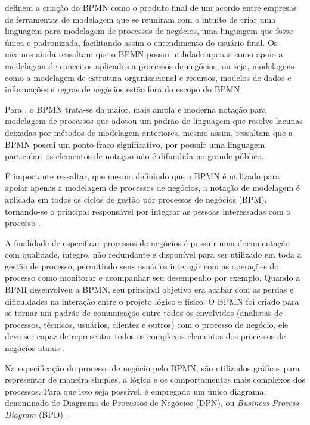 \documentclass[
	12pt,				%
	openright,			%
	oneside,			%
	a4paper,			%
	chapter=TITLE,		%
	section=TITLE,		%
	english,			%
	french,				%
	spanish,			%
	brazil				%
	]{abntex2}
\begin{document}
 definem a criação do BPMN como o produto final de um acordo entre empresas de ferramentas de modelagem que se reuniram com o intuito de criar uma linguagem para modelagem de processos de negócios, uma linguagem que fosse única e padronizada, facilitando assim o entendimento do usuário final. Os mesmos ainda ressaltam que o BPMN possui utilidade apenas como apoio a modelagem de conceitos aplicados a processos de negócios, ou seja, modelagens como a modelagem de estrutura organizacional e recursos, modelos de dados e informações e regras de negócios estão fora do escopo do BPMN. 

Para , o BPMN trata-se da maior, mais ampla e moderna notação para modelagem de processos que adotou um padrão de linguagem que resolve lacunas deixadas por métodos de modelagem anteriores, mesmo assim, ressaltam que a BPMN possui um ponto fraco significativo, por possuir uma linguagem particular, os elementos de notação não é difundida no grande público. 

É importante ressaltar, que mesmo  definindo que o BPMN é utilizado para apoiar apenas a modelagem de processos de negócios, a notação de modelagem é aplicada em todos os ciclos de gestão por processos de negócios (BPM), tornando-se o principal responsável por integrar as pessoas interessadas com o processo \cite{sordiGestaoModerna}.

A finalidade de especificar processos de negócios é possuir uma documentação com qualidade, íntegro, não redundante e disponível para ser utilizado em toda a gestão de processo, permitindo seus usuários interagir com as operações do processo como monitorar e acompanhar seu desempenho por exemplo. Quando a BPMI desenvolveu a BPMN, seu principal objetivo era acabar com as perdas e dificuldades na interação entre o projeto lógico e físico. O BPMN foi criado para se tornar um padrão de comunicação entre todos os envolvidos (analistas de processos, técnicos, usuários, clientes e outros) com o processo de negócio, ele deve ser capaz de representar todos os complexos elementos dos processos de negócios atuais \cite{sordiGestaoModerna}.

Na especificação do processo de negócio pelo BPMN, são utilizados gráficos para representar de maneira simples, a lógica e os comportamentos mais complexos dos processos. Para que isso seja possível, é empregado um único diagrama, denominado de Diagrama de Processos de Negócios (DPN), ou \textit{Business Process Diagram} (BPD) \cite{araujoGestao}.
\end{document}
